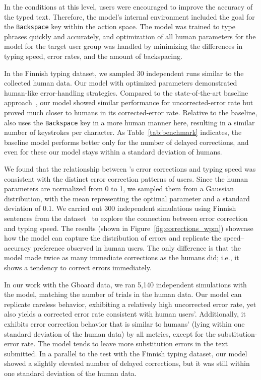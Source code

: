 In the conditions at this level, users were encouraged to improve the accuracy of the typed text. Therefore, the model's internal environment included the goal for the \texttt{Backspace} key within the action space. The model was trained to type phrases quickly and accurately, and optimization of all human parameters for the model for the target user group was handled by minimizing the differences in typing speed, error rates, and the amount of backspacing.

In the Finnish typing dataset, we sampled 30 independent runs similar to the collected human data. Our model with optimized parameters demonstrated human-like error-handling strategies. Compared to the state-of-the-art baseline approach~\cite{shi2024crtypist}, our model showed similar performance for uncorrected-error rate but proved much closer to humans in its corrected-error rate. Relative to the baseline, \name also uses the \texttt{Backspace} key in a more human manner here, resulting in a similar number of keystrokes per character. As Table~\ref{tab:benchmark} indicates, the baseline model performs better only for the number of delayed corrections, and even for these our model stays within a standard deviation of humans.

We found that the relationship between \name's error corrections and typing speed was consistent with the distinct error correction patterns of users. Since the human parameters are normalized from 0 to 1, we sampled them from a Gaussian distribution, with the mean representing the optimal parameter and a standard deviation of 0.1. We carried out 300 independent simulations using Finnish sentences from the dataset~\cite{jiang2020we} to explore the connection between error correction and typing speed. The results (shown in Figure~\ref{fig:corrections_wpm}) showcase how the model can capture the distribution of errors and replicate the speed--accuracy preference observed in human users. The only difference is that the model made twice as many immediate corrections as the humans did; i.e., it shows a tendency to correct errors immediately.

In our work with the Gboard data, we ran 5,140 independent simulations with the model, matching the number of trials in the human data. Our model can replicate careless behavior, exhibiting a relatively high uncorrected error rate, yet also yields a corrected error rate consistent with human users'. Additionally, it exhibits error correction behavior that is similar to humans' (lying within one standard deviation of the human data) by all metrics, except for the substitution-error rate. The model tends to leave more substitution errors in the text submitted. In a parallel to the test with the Finnish typing dataset, our model showed a slightly elevated number of delayed corrections, but it was still within one standard deviation of the human data.

